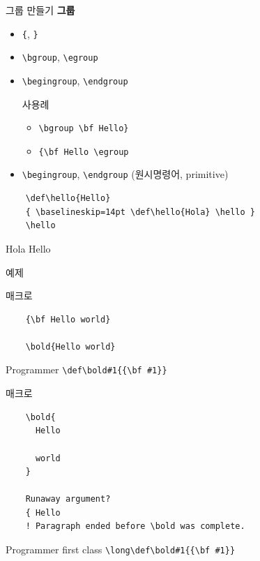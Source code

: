 \documentclass{beamer}
\begin{document}
%
\begin{frame}[fragile]{그룹 만들기}
  \textbf{\alert{그룹}}
  \begin{itemize}
  \item \verb+{+, \verb+}+
  \item \verb+\bgroup+, \verb+\egroup+
  \item \verb+\begingroup+, \verb+\endgroup+
    \begin{alertblock}{사용례}
      \begin{itemize}
      \item \verb+\bgroup \bf Hello}+
      \item \verb+{\bf Hello \egroup+
      \end{itemize}
    \end{alertblock}
  \item \verb+\begingroup+, \verb+\endgroup+ (원시명령어, primitive)
  \end{itemize}

  {\small
\begin{verbatim}
    \def\hello{Hello}
    { \baselineskip=14pt \def\hello{Hola} \hello }
    \hello
\end{verbatim}}

  Hola Hello
\end{frame}


%
\begin{frame}[standout]
  예제
\end{frame}


%
\begin{frame}[fragile]{\texttt{\string\bold} 매크로}
\begin{verbatim}
    {\bf Hello world}
    
    \bold{Hello world}
\end{verbatim}
  \begin{alertblock}{Programmer}
    \verb+\def\bold#1{{\bf #1}}+
  \end{alertblock}
\end{frame}


%
\begin{frame}[fragile]{\texttt{\string\bold} 매크로}
\begin{verbatim}
    \bold{
      Hello

      world
    }

    Runaway argument?
    { Hello
    ! Paragraph ended before \bold was complete.
\end{verbatim}
  \begin{alertblock}{Programmer first class}
    \verb+\long\def\bold#1{{\bf #1}}+
  \end{alertblock}
\end{frame}
\end{document}
